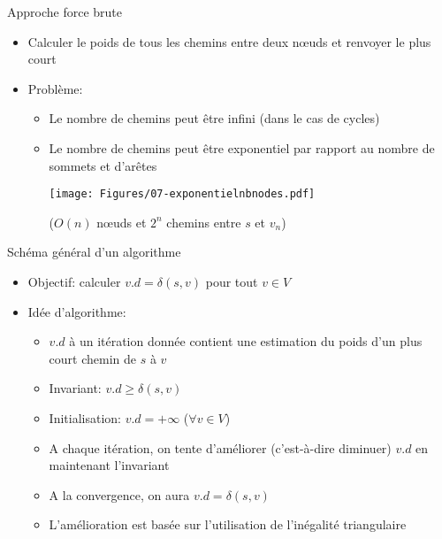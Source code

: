 \begin{frame}{Approche force brute}

\begin{itemize}
\item Calculer le poids de tous les chemins entre deux n\oe uds et renvoyer le plus court
\item Problème:
\begin{itemize}
\item Le nombre de chemins peut être infini (dans le cas de cycles)

\item Le nombre de chemins peut être exponentiel par rapport au nombre de sommets et d'arêtes\\

\bigskip

\centerline{\texttt{[image: Figures/07-exponentielnbnodes.pdf]}}

\bigskip

\centerline{($O(n)$ n\oe uds et $2^n$ chemins entre $s$ et $v_n$)}

\end{itemize}
\end{itemize}

\end{frame}

\begin{frame}{Schéma général d'un algorithme}

\begin{itemize}
\item Objectif: calculer $v.d=\delta(s,v)$ pour tout $v\in V$

\bigskip

\item Idée d'algorithme:
\begin{itemize}
\item $v.d$ à un itération donnée contient une \alert{estimation} du poids d'un plus court chemin de $s$ à $v$
\item Invariant: $v.d\geq \delta(s,v)$
\item Initialisation: $v.d=+\infty$ ($\forall v \in V$)
\item A chaque itération, on tente d'améliorer (c'est-à-dire diminuer) $v.d$ en maintenant l'invariant
\item A la convergence, on aura $v.d=\delta(s,v)$
\item L'amélioration est basée sur l'utilisation de l'inégalité triangulaire
\end{itemize}
\end{itemize}

\end{frame}

